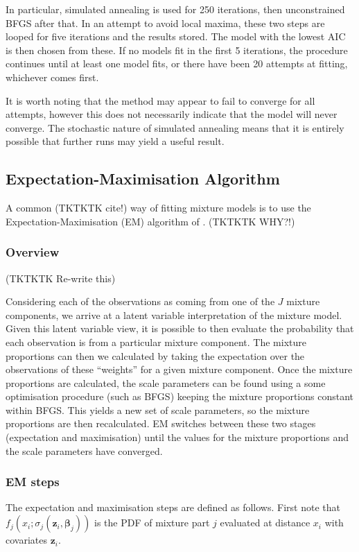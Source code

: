 In particular, simulated annealing is used for 250 iterations, then unconstrained BFGS after that. In an attempt to avoid local maxima, these two steps are looped for five iterations and the results stored. The model with the lowest AIC is then chosen from these. If no models fit in the first 5 iterations, the procedure continues until at least one model fits, or there have been 20 attempts at fitting, whichever comes first.

It is worth noting that the method may appear to fail to converge for all attempts, however this does not necessarily indicate that the model will never converge. The stochastic nature of simulated annealing means that it is entirely possible that further runs may yield a useful result.

\subsection{Expectation-Maximisation Algorithm}
A common (TKTKTK cite!) way of fitting mixture models is to use the Expectation-Maximisation (EM) algorithm of \cite{em}. (TKTKTK WHY?!)


\subsubsection{Overview}

(TKTKTK Re-write this)

Considering each of the observations as coming from one of the $J$ mixture components, we arrive at a latent variable interpretation of the mixture model. Given this latent variable view, it is possible to then evaluate the probability that each observation is from a particular mixture component. The mixture proportions can then we calculated by taking the expectation over the observations of these ``weights'' for a given mixture component. Once the mixture proportions are calculated, the scale parameters can be found using a some optimisation procedure (such as BFGS) keeping the mixture proportions constant within BFGS. This yields a new set of scale parameters, so the mixture proportions are then recalculated. EM switches between these two stages (expectation and maximisation) until the values for the mixture proportions and the scale parameters have converged.

\subsubsection{EM steps}
The expectation and maximisation steps are defined as follows. First note that $f_j(x_i;\sigma_j(\bm{z}_i,\bm{\beta}_j))$ is the PDF of mixture part $j$ evaluated at distance $x_i$ with covariates $\bm{z}_i$. 


